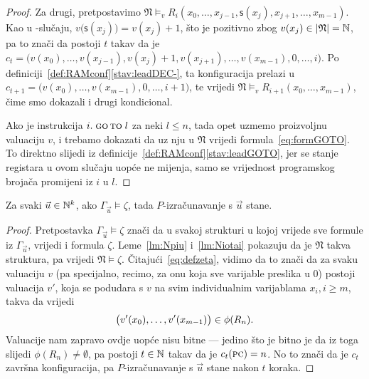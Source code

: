 \begin{proof}
Za drugi, pretpostavimo $\mathfrak N\models_v R_i(x_0,\dotsc,x_{j-1},\mathsf s(x_j),x_{j+1},\dotsc,x_{m-1})$. Kao u \inc-slučaju, $v\bigl(\mathsf s(x_j)\bigr)=v(x_j)+1$, što je pozitivno zbog $v(x_j)\in\lvert\mathfrak N\rvert={\mathbb N}$, pa to znači da postoji $t$ takav da je $c_t=\bigl(v(x_0),\dotsc,v(x_{j-1}),v(x_j)+1,v(x_{j+1}),\dotsc,v(x_{m-1}),0,\dotsc,i\bigr)$. Po definiciji~\ref{def:RAMconf}\eqref{stav:leadDEC-}, ta konfiguracija prelazi u $c_{t+1}=\bigl(v(x_0),\dotsc,v(x_{m-1}),0,\dotsc,i+1\bigr)$, te vrijedi $\mathfrak N\models_v R_{i+1}(x_0,\dotsc,x_{m-1})$, čime smo dokazali i drugi kondicional.

Ako je instrukcija $i.\;\textsc{go\,to}\;l$ za neki $l\le n$, tada opet uzmemo proizvoljnu valuaciju $v$, i trebamo dokazati da uz nju u $\mathfrak N$ vrijedi formula~\eqref{eq:formGOTO}. To direktno slijedi iz definicije~\ref{def:RAMconf}\eqref{stav:leadGOTO}, jer se stanje registara u ovom slučaju uopće ne mijenja, samo se vrijednost programskog brojača promijeni iz $i$ u $l$.
\end{proof}

\begin{propozicija}[{name=[zaključivanje povlači zaustavljanje]}]\label{pp:models>stop}
Za svaki $\vec u\in{\mathbb N}^k$, ako $\Gamma_{\vec u}\models\zeta$, tada $P$-izračunavanje s $\vec u$ stane.
\end{propozicija}
\begin{proof}
Pretpostavka $\Gamma_{\vec u}\models\zeta$ znači da u svakoj strukturi u kojoj vrijede sve formule iz $\Gamma_{\vec u}$, vrijedi i formula $\zeta$. Leme~\ref{lm:Npiu} i~\ref{lm:Niotai} pokazuju da je $\mathfrak N$ takva struktura, pa vrijedi $\mathfrak N\models\zeta$. Čitajući~\eqref{eq:defzeta}, vidimo da to znači da za svaku valuaciju $v$ (pa specijalno, recimo, za onu koja sve varijable preslika u $0$) postoji valuacija $v'$, koja se podudara s $v$ na svim individualnim varijablama $x_i,i\ge m$, takva da vrijedi
\begin{equation}
    \bigl(v'(x_0),\dotsc,v'(x_{m-1})\bigr)\in\phi(R_n)\text.
\end{equation}
Valuacije nam zapravo ovdje uopće nisu bitne --- jedino što je bitno je da iz toga slijedi $\phi(R_n)\not=\emptyset$, pa postoji $t\in{\mathbb N}$ takav da je $c_t(\textsc{pc})=n$. No to znači da je $c_t$ završna konfiguracija, pa $P$-izračunavanje s $\vec u$ stane nakon $t$ koraka.
\end{proof}


